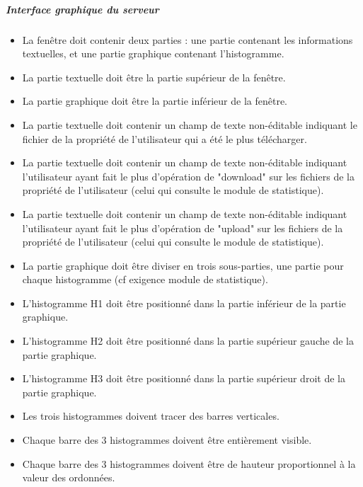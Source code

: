 \documentclass[10pt,a4paper]{report}
\begin{document}
\subparagraph{\textbf{Interface graphique du serveur }}
\begin{itemize}[label = $\triangleright$]
\item La fenêtre doit contenir deux parties : une partie contenant les informations textuelles, et une partie graphique contenant l'histogramme.

\item La partie textuelle doit être la partie supérieur de la fenêtre.

\item La partie graphique doit être la partie inférieur de la fenêtre.

\item La partie textuelle doit contenir un champ de texte non-éditable indiquant le fichier de la propriété de l'utilisateur qui a été le plus télécharger.

\item La partie textuelle doit contenir un champ de texte non-éditable indiquant l'utilisateur ayant fait le plus d'opération de "download" sur les fichiers de la propriété de l'utilisateur (celui qui consulte le module de statistique).

\item La partie textuelle doit contenir un champ de texte non-éditable indiquant l'utilisateur ayant fait le plus d'opération de "upload" sur les fichiers de la propriété de l'utilisateur (celui qui consulte le module de statistique).

\item La partie graphique doit être diviser en trois sous-parties, une partie pour chaque histogramme (cf exigence module de statistique).

\item L'histogramme H1 doit être positionné dans la partie inférieur de la partie graphique.

\item L'histogramme H2 doit être positionné dans la partie supérieur gauche de la partie graphique.

\item L'histogramme H3 doit être positionné dans la partie supérieur droit de la partie graphique.

\item Les trois histogrammes doivent tracer des barres verticales.

\item Chaque barre des 3 histogrammes doivent être entièrement visible.

\item Chaque barre des 3 histogrammes doivent être de hauteur proportionnel à la valeur des ordonnées.


\end{itemize}
\end{document}
